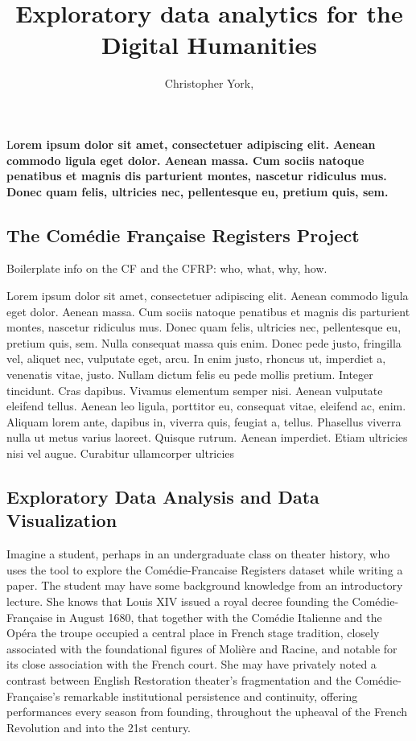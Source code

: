 \documentclass[	DIV=calc,%
							paper=a4,%
							fontsize=11pt,%
							twocolumn]{scrartcl}	 					%
\title{Exploratory data analytics for the Digital Humanities}					%
\author{Christopher York, }											%
\date{}																				%
\newcommand{\initial}[1]{%
     \lettrine[lines=3,lhang=0.3,nindent=0em]{
     				\color{DarkGoldenrod}
     				{\textsf{#1}}}{}}
\begin{document}
\maketitle
\thispagestyle{fancy} 			%
\initial{L}\textbf{orem ipsum dolor sit amet, consectetuer adipiscing elit. Aenean commodo ligula eget dolor. Aenean massa. Cum sociis natoque penatibus et magnis dis parturient montes, nascetur ridiculus mus. Donec quam felis, ultricies nec, pellentesque eu, pretium quis, sem.}

\subsection*{The Comédie Française Registers Project}
Boilerplate info on the CF and the CFRP: who, what, why, how.

Lorem ipsum dolor sit amet, consectetuer adipiscing elit. Aenean commodo ligula eget dolor. Aenean massa. Cum sociis natoque penatibus et magnis dis parturient montes, nascetur ridiculus mus. Donec quam felis, ultricies nec, pellentesque eu, pretium quis, sem. Nulla consequat massa quis enim. Donec pede justo, fringilla vel, aliquet nec, vulputate eget, arcu. In enim justo, rhoncus ut, imperdiet a, venenatis vitae, justo. Nullam dictum felis eu pede mollis pretium. Integer tincidunt. Cras dapibus. Vivamus elementum semper nisi. Aenean vulputate eleifend tellus. Aenean leo ligula, porttitor eu, consequat vitae, eleifend ac, enim. Aliquam lorem ante, dapibus in, viverra quis, feugiat a, tellus. Phasellus viverra nulla ut metus varius laoreet. Quisque rutrum. Aenean imperdiet. Etiam ultricies nisi vel augue. Curabitur ullamcorper ultricies


\subsection*{Exploratory Data Analysis and Data Visualization}

Imagine a student, perhaps in an undergraduate class on theater history, who uses the tool to explore the Comédie-Francaise Registers dataset while writing a paper. The student may have some background knowledge from an introductory lecture.  She knows that Louis XIV issued a royal decree founding the Comédie-Française in August 1680, that together with the Comédie Italienne and the Opéra the troupe occupied a central place in French stage tradition, closely associated with the foundational figures of Molière and Racine, and notable for its close association with the French court.  She may have privately noted a contrast between English Restoration theater’s fragmentation and the Comédie-Française’s remarkable institutional persistence and continuity, offering performances every season from founding, throughout the upheaval of the French Revolution and into the 21st century.
\end{document}
